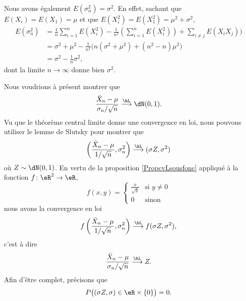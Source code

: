 \begin{example}
    Nous avons également \( E(\sigma_n^2)=\sigma^2\). En effet, sachant que \( E(X_i)=E(X_1)=\mu\) et que \( E(X_i^2)=E(X_1^2)=\mu^2+\sigma^2\),
    \begin{subequations}
        \begin{align}
            E(\sigma_n^2)&=\frac{1}{ n }\sum_{i=1}^nE(X_i^2)-\frac{1}{ n^2 }\left( \sum_{i=1}^nE(X_i^2) \right)+\sum_{i\neq j}E(X_iX_j))\\
            &=\sigma^2+\mu^2-\frac{1}{ n^2 }\big( n(\sigma^2+\mu^2)+(n^2-n)\mu^2 \big)\\
            &=\sigma^2-\frac{1}{ n }\sigma^2,
        \end{align}
    \end{subequations}
    dont la limite \( n\to\infty\) donne bien \( \sigma^2\).

    Nous voudrions à présent montrer que 
    \begin{equation}
        \frac{ \bar X_n-\mu }{ \sigma_n/\sqrt{n} }\stackrel{\hL}{\longrightarrow}\dN(0,1).
    \end{equation}
    Vu que le théorème central limite donne une convergence en loi, nous pouvons utiliser le lemme de Slutsky pour montrer que
    \begin{equation}
        \left( \frac{ \bar X_n-\mu }{ 1/\sqrt{n} },\sigma_n^2 \right)\stackrel{\hL}{\longrightarrow}(\sigma Z,\sigma^2)
    \end{equation}
    où \( Z\sim\dN(0,1)\). En vertu de la proposition \ref{PropcvLsousfonc} appliqué à la fonction \( f\colon \eR^2\to \eR\),
    \begin{equation}
        f(x,y)=\begin{cases}
            \frac{ x }{ \sqrt{y} }    &   \text{si } y\neq 0\\
            0    &    \text{sinon}
        \end{cases}
    \end{equation}
    nous avons la convergence en loi
    \begin{equation}
        f\left( \frac{ \bar X_n-\mu }{ 1/\sqrt{n} },\sigma_n^2 \right)\stackrel{\hL}{\longrightarrow}f(\sigma Z,\sigma^2),
    \end{equation}
    c'est à dire 
    \begin{equation}
        \frac{ \bar X_n-\mu }{ \sigma_n/\sqrt{n} }\stackrel{\hL}{\longrightarrow}Z.
    \end{equation}
    Afin d'être complet, précisons que 
    \begin{equation}
        P\big( (\sigma Z,\sigma)\in\eR\times \{ 0 \} \big)=0.
    \end{equation}
\end{example}

